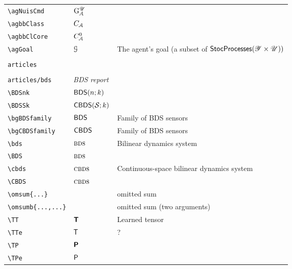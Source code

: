 \begin{longtable}{lll}
 {\color[rgb]{0.5,0.5,0.5}\texttt{\textbackslash agNuisCmd}} & $\mathrm{G}_{\mathcal{A}}^{\mathscr{U}}$ & \\ 
 {\color[rgb]{0.5,0.5,0.5}\texttt{\textbackslash agbbClass}} & $C_{\mathcal{A}}$ & \\ 
 {\color[rgb]{0.5,0.5,0.5}\texttt{\textbackslash agbbClCore}} & $C_{\mathcal{A}}^{0}$ & \\ 
 {\color[rgb]{0.5,0.5,0.5}\texttt{\textbackslash agGoal}} & $\mathcal{G}$ &  The agent's goal (a subset of $\mathsf{StocProcesses}(\mathscr{Y}\times\mathscr{U}))$\\ 
  &  & \\ 
 {\color[rgb]{0.5,0.5,0.5}\texttt{articles}} & \multicolumn{2}{l}{\emph{}}\\ 
 \hline
\hline
 &  & \\ 
 {\color[rgb]{0.5,0.5,0.5}\texttt{articles/bds}} & \multicolumn{2}{l}{\emph{BDS report}}\\ 
 \hline
{\color[rgb]{0.5,0.5,0.5}\texttt{\textbackslash BDSnk}} & $\mathsf{BDS}(n;k)$ & \\ 
 {\color[rgb]{0.5,0.5,0.5}\texttt{\textbackslash BDSSk}} & $\BDSSk$ & \\ 
 {\color[rgb]{0.5,0.5,0.5}\texttt{\textbackslash bgBDSfamily}} & $\mathsf{BDS}$ &  Family of BDS sensors\\ 
 {\color[rgb]{0.5,0.5,0.5}\texttt{\textbackslash bgCBDSfamily}} & $\mathsf{CBDS}$ &  Family of BDS sensors\\ 
 {\color[rgb]{0.5,0.5,0.5}\texttt{\textbackslash bds}} & $\textsc{bds}$ &  Bilinear dynamics system\\ 
 {\color[rgb]{0.5,0.5,0.5}\texttt{\textbackslash BDS}} & $\textsc{bds}$ & \\ 
 {\color[rgb]{0.5,0.5,0.5}\texttt{\textbackslash cbds}} & $\textsc{cbds}$ &  Continuous-space bilinear dynamics system\\ 
 {\color[rgb]{0.5,0.5,0.5}\texttt{\textbackslash CBDS}} & $\textsc{cbds}$ & \\ 
 {\color[rgb]{0.5,0.5,0.5}\texttt{\textbackslash omsum\{...\}}} &  &  omitted sum\\ 
 {\color[rgb]{0.5,0.5,0.5}\texttt{\textbackslash omsumb\{...,...\}}} &  &  omitted sum (two arguments)\\ 
 {\color[rgb]{0.5,0.5,0.5}\texttt{\textbackslash TT}} & $\boldsymbol{{\mathsf{T}}}$ &  Learned tensor\\ 
 {\color[rgb]{0.5,0.5,0.5}\texttt{\textbackslash TTe}} & ${\mathsf{T}}$ &  ?\\ 
 {\color[rgb]{0.5,0.5,0.5}\texttt{\textbackslash TP}} & $\boldsymbol{{\mathsf{P}}}$ & \\ 
 {\color[rgb]{0.5,0.5,0.5}\texttt{\textbackslash TPe}} & ${\mathsf{P}}$ & \\ 

\end{longtable}
